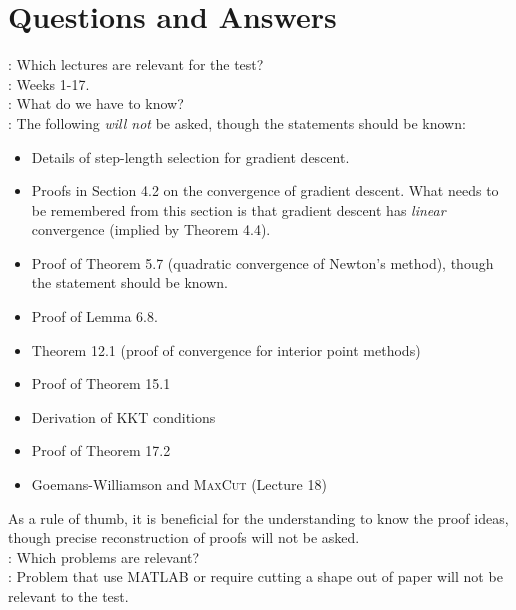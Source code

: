 %
%
% 

\section*{Questions and Answers}

: Which lectures are relevant for the test?\\

: Weeks 1-17. \\

: What do we have to know?\\

: The following {\em will not} be asked, though the statements should be known:
\begin{itemize}
\item Details of step-length selection for gradient descent.
\item Proofs in Section 4.2 on the convergence of gradient descent. What needs to be remembered from this section is that gradient descent has {\em linear} convergence (implied by Theorem 4.4).
\item Proof of Theorem 5.7 (quadratic convergence of Newton's method), though the statement should be known.
\item Proof of Lemma 6.8.
\item Theorem 12.1 (proof of convergence for interior point methods)
\item Proof of Theorem 15.1
\item Derivation of KKT conditions
\item Proof of Theorem 17.2
\item Goemans-Williamson and \textsc{MaxCut} (Lecture 18)
\end{itemize}
As a rule of thumb, it is beneficial for the understanding to know the proof ideas, though precise reconstruction of proofs will not be asked.\\


: Which problems are relevant?\\

: Problem that use MATLAB or require cutting a shape out of paper will not be relevant to the test.


